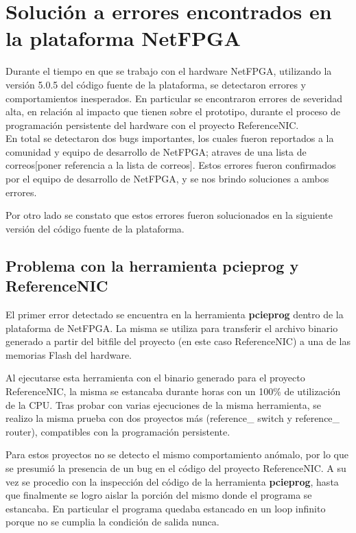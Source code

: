 \chapter{Soluci\'on a errores encontrados en la plataforma NetFPGA} 
\label{apendiceA}

Durante el tiempo en que se trabajo con el hardware NetFPGA, utilizando la versi\'on 5.0.5 del c\'odigo fuente de la plataforma, se detectaron errores y comportamientos inesperados. En particular se encontraron errores de severidad alta, en relaci\'on al impacto que tienen sobre el prototipo, durante el proceso de programaci\'on persistente del hardware con el proyecto ReferenceNIC.\\

En total se detectaron dos bugs importantes, los cuales fueron reportados a la comunidad y equipo de desarrollo de NetFPGA; atraves de una lista de correos[poner referencia a la lista de correos]. Estos errores fueron confirmados por el equipo de desarrollo de NetFPGA, y se nos brindo soluciones a ambos errores. 

Por otro lado se constato que estos errores fueron solucionados en la siguiente versi\'on del c\'odigo fuente de la plataforma.\\ 
 
\section{Problema con la herramienta pcieprog y ReferenceNIC}
El primer error detectado se encuentra en la herramienta \textbf{pcieprog} dentro de la plataforma de NetFPGA. La misma se utiliza para transferir el archivo binario generado a partir del bitfile del proyecto (en este caso ReferenceNIC) a una de las memorias Flash del hardware.

Al ejecutarse esta herramienta con el binario generado para el proyecto ReferenceNIC, la misma se estancaba durante horas con un 100\% de utilizaci\'on de la CPU. Tras probar con varias ejecuciones de la misma herramienta, se realizo la misma prueba con dos proyectos m\'as (reference\_ switch y reference\_ router), compatibles con la programaci\'on persistente. 

Para estos proyectos no se detecto el mismo comportamiento an\'omalo, por lo que se presumi\'o la presencia de un bug en el c\'odigo del proyecto ReferenceNIC. A su vez se procedio con la inspecci\'on del c\'odigo de la herramienta \textbf{pcieprog}, hasta que finalmente se logro aislar la porci\'on del mismo donde el programa se estancaba. En particular el programa quedaba estancado en un loop infinito porque no se cumplia la condici\'on de salida nunca.\\ 

